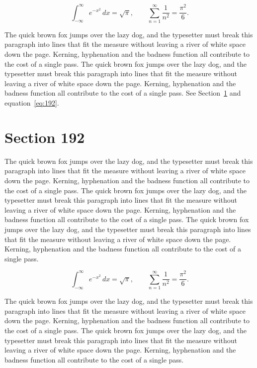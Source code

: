 \documentclass{article}
\begin{document}
\begin{equation}\label{eq:191}
\int_{-\infty}^{\infty} e^{-x^{2}}\,dx = \sqrt{\pi}, \qquad
\sum_{n=1}^{\infty} \frac{1}{n^{2}} = \frac{\pi^{2}}{6}.
\end{equation}

The quick brown fox jumps over the lazy dog, and the typesetter must break this paragraph into lines that fit the measure without leaving a river of white space down the page. Kerning, hyphenation and the badness function all contribute to the cost of a single pass. The quick brown fox jumps over the lazy dog, and the typesetter must break this paragraph into lines that fit the measure without leaving a river of white space down the page. Kerning, hyphenation and the badness function all contribute to the cost of a single pass. 
See Section~\ref{sec:192} and equation~\eqref{eq:192}.
\section{Section 192}
\label{sec:192}
The quick brown fox jumps over the lazy dog, and the typesetter must break this paragraph into lines that fit the measure without leaving a river of white space down the page. Kerning, hyphenation and the badness function all contribute to the cost of a single pass. The quick brown fox jumps over the lazy dog, and the typesetter must break this paragraph into lines that fit the measure without leaving a river of white space down the page. Kerning, hyphenation and the badness function all contribute to the cost of a single pass. The quick brown fox jumps over the lazy dog, and the typesetter must break this paragraph into lines that fit the measure without leaving a river of white space down the page. Kerning, hyphenation and the badness function all contribute to the cost of a single pass. 

\begin{equation}\label{eq:192}
\int_{-\infty}^{\infty} e^{-x^{2}}\,dx = \sqrt{\pi}, \qquad
\sum_{n=1}^{\infty} \frac{1}{n^{2}} = \frac{\pi^{2}}{6}.
\end{equation}

The quick brown fox jumps over the lazy dog, and the typesetter must break this paragraph into lines that fit the measure without leaving a river of white space down the page. Kerning, hyphenation and the badness function all contribute to the cost of a single pass. The quick brown fox jumps over the lazy dog, and the typesetter must break this paragraph into lines that fit the measure without leaving a river of white space down the page. Kerning, hyphenation and the badness function all contribute to the cost of a single pass. 
\end{document}
